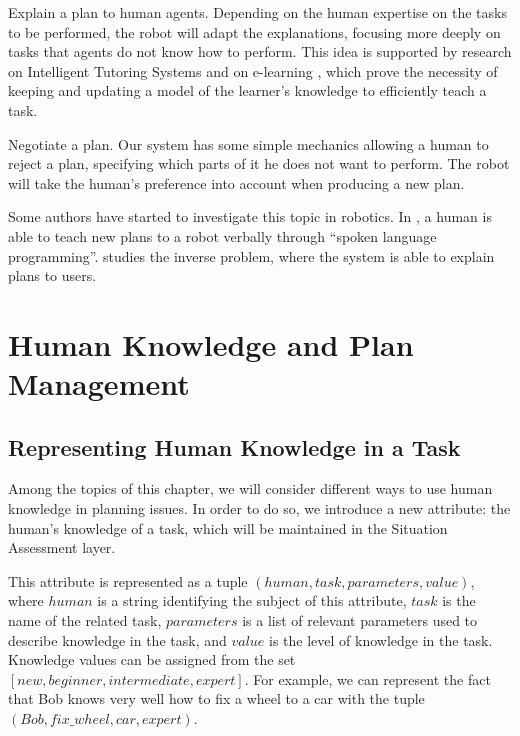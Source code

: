 \item Explain a plan to human agents. Depending on the human expertise on the tasks to be performed, the robot will adapt the explanations, focusing more deeply on tasks that agents do not know how to perform. This idea is supported by research on Intelligent Tutoring Systems \cite{brusilovskiy1994construction}  and on e-learning \cite{brusilovskiy2005}, which  prove the necessity of keeping and updating a model of the learner's knowledge to efficiently teach a task.
	\item Negotiate a plan. Our system has some simple mechanics allowing a human to reject a plan, specifying which parts of it he does not want to perform. The robot will take the human's preference into account when producing a new plan.
	



Some authors have started to investigate this topic in robotics. In \cite{Petit2012}, a human is able to teach new plans to a robot verbally through ``spoken language programming''. \cite{Sorce2015} studies the inverse problem, where the system is able to explain plans to users. 


\section{Human Knowledge and Plan Management}
\label{sec:plan_management-human_knowledge}
\subsection{Representing Human Knowledge in a Task}
Among the topics of this chapter, we will consider different ways to use human knowledge in planning issues. In order to do so, we introduce a new attribute: the human's knowledge of a task, which will be maintained in the Situation Assessment layer. 

This attribute is represented as a tuple $(human, task, parameters, value)$, where $human$ is a string identifying the subject of this attribute, $task$ is the name of the related task, $parameters$ is a list of relevant parameters used to describe knowledge in the task, and $value$ is the level of knowledge in the task. Knowledge values can be assigned from the set $[new, beginner, intermediate, expert]$.  For example, we can represent the fact that Bob knows very well how to fix a wheel to a car with the tuple $(Bob, fix\_wheel, car, expert)$. 

